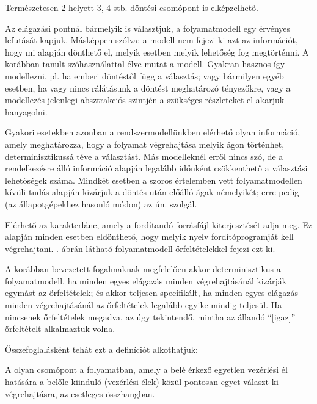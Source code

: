 Természetesen 2 helyett 3, 4 stb.  döntési csomópont is elképzelhető.

Az elágazási pontnál bármelyik  is választjuk, a folyamatmodell egy érvényes lefutását kapjuk. Másképpen szólva: a modell nem fejezi ki azt az információt, hogy mi alapján dönthető el, melyik esetben melyik lehetőség fog megtörténni. A korábban tanult szóhasználattal élve  mutat a modell. Gyakran hasznos így modellezni, pl. ha emberi döntéstől függ a választás; vagy bármilyen egyéb esetben, ha vagy nincs rálátásunk a döntést meghatározó tényezőkre, vagy a modellezés jelenlegi absztrakciós szintjén a szükséges részleteket el akarjuk hanyagolni. 

Gyakori esetekben azonban a rendszermodellünkben elérhető olyan információ, amely meghatározza, hogy a folyamat végrehajtása melyik ágon történhet, determinisztikussá téve a választást. Más modelleknél erről nincs szó, de a rendelkezésre álló információ alapján legalább időnként csökkenthető a választási lehetőségek száma. Mindkét esetben a szoros értelemben vett folyamatmodellen kívüli tudás alapján kizárjuk a döntés után előálló ágak némelyikét; erre pedig (az állapotgépekhez hasonló módon) az ún.  szolgál. 

\begin{pelda}
Elérhető az  karakterlánc, amely a fordítandó forrásfájl kiterjesztését adja meg. Ez alapján minden esetben eldönthető, hogy melyik nyelv fordítóprogramját kell végrehajtani. . ábrán látható folyamatmodell őrfeltételekkel fejezi ezt ki.
\end{pelda}


A korábban bevezetett fogalmaknak megfelelően akkor determinisztikus a folyamatmodell, ha minden egyes elágazás minden végrehajtásánál kizárják egymást az őrfeltételek; és akkor teljesen specifikált, ha minden egyes elágazás minden végrehajtásánál az őrfeltételek legalább egyike mindig teljesül. Ha nincsenek őrfeltételek megadva, az úgy tekintendő, mintha az állandó ``[igaz]'' őrfeltételt alkalmaztuk volna.

Összefoglalásként tehát ezt a definíciót alkothatjuk:

\begin{definicio}
	A  olyan csomópont a folyamatban, amely a belé érkező egyetlen vezérlési él hatására a belőle kiinduló  (vezérlési élek) közül pontosan egyet választ ki végrehajtásra, az esetleges  összhangban.
\end{definicio}


